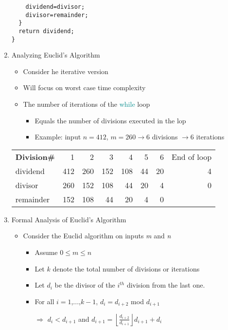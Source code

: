 \begin{enumerate}
\begin{minipage}[t]{0.5\textwidth}
\begin{lstlisting}
    dividend=divisor;
    divisor=remainder;
  }
  return dividend;
}
\end{lstlisting}
\end{minipage}
\item Analyzing Euclid's Algorithm
  \begin{itemize}
  \item Consider he iterative version
  \item Will focus on worst case time complexity
  \item The number of iterations of the \textcolor{DarkCyan}{while} loop
    \begin{itemize}
    \item Equals the number of divisions executed in the lop
    \item Example: input $n=412$, $m=260\rightarrow6$ divisions $\rightarrow6$ iterations
    \end{itemize}
  \end{itemize}
  \begin{tabular}{l r r r r r r r}
  \rowcolor{LightCyan} \textbf{Division\#} & 1   & 2   & 3   & 4   & 5  & 6  & End of loop \\
  \rowcolor{DarkCyan} dividend            & 412 & 260 & 152 & 108 & 44 & 20 & 4 \\
  \rowcolor{LightCyan} divisor            & 260 & 152 & 108 & 44  & 20 & 4  & 0 \\
  \rowcolor{DarkCyan} remainder           & 152 & 108 & 44  & 20  & 4  & 0  &   \\
  \end{tabular}
\item Formal Analysis of Euclid's Algorithm
  \begin{itemize}
  \item Consider the Euclid algorithm on inputs \emph{m} and \emph{n}
    \begin{itemize}
    \item Assume $0\leq m\leq n$
    \item Let $k$ denote the total number of divisions or iterations
    \item Let $d_{i}$ be the divisor of the $i^{th}$ division from the last one.
    \item For all $i=1$,...,$k-1$, $d_{i}=d_{i+2}$ mod $d_{i+1}$
    \item [$\Rightarrow$] $d_{i} < d_{i+1}$ and $d_{i+1}=\left\lfloor\frac{d_{i+2}}{d_{i+1}}\right\rfloor d_{i+1}+d_{i}$
    \end{itemize}
  \end{itemize}

\end{enumerate}
